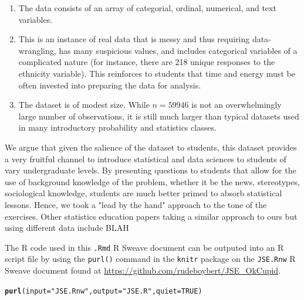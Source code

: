 \documentclass{article}\usepackage[]{graphicx}\usepackage[]{color}
\makeatletter
\newcommand{\hlnum}[1]{\textcolor[rgb]{0.686,0.059,0.569}{#1}}%
\newcommand{\hlstr}[1]{\textcolor[rgb]{0.192,0.494,0.8}{#1}}%
\newcommand{\hlstd}[1]{\textcolor[rgb]{0.345,0.345,0.345}{#1}}%
\newcommand{\hlkwc}[1]{\textcolor[rgb]{0.333,0.667,0.333}{#1}}%
\newcommand{\hlkwd}[1]{\textcolor[rgb]{0.737,0.353,0.396}{\textbf{#1}}}%
\newenvironment{kframe}{%
 \def\at@end@of@kframe{}%
 \ifinner\ifhmode%
  \def\at@end@of@kframe{\end{minipage}}%
  \begin{minipage}{\columnwidth}%
 \fi\fi%
 \def\FrameCommand##1{\hskip\@totalleftmargin \hskip-\fboxsep
 \colorbox{shadecolor}{##1}\hskip-\fboxsep
     \hskip-\linewidth \hskip-\@totalleftmargin \hskip\columnwidth}%
 \MakeFramed {\advance\hsize-\width
   \@totalleftmargin\z@ \linewidth\hsize
   \@setminipage}}%
 {\par\unskip\endMakeFramed%
 \at@end@of@kframe}
\newenvironment{knitrout}{}{} %
\makeatother
\begin{document}
\begin{enumerate}
\item The data consists of an array of categorial, ordinal, numerical, and text variables.
\item This is an instance of real data that is messy and thus requiring data-wrangling, has many suspicious values, and includes categorical variables of a complicated nature (for instance, there are 218 unique responses to the ethnicity variable).  This reinforces to students that time and energy must be often invested into preparing the data for analysis.
\item The dataset is of modest size.  While $n = 59946$ is not an overwhelmingly large number of observations, it is still much larger than typical datasets used in many introductory probability and statistics classes.
\end{enumerate}

We argue that given the salience of the dataset to students, this dataset provides a very fruitful channel to introduce statistical and data sciences to students of vary undergraduate levels.  By presenting questions to students that allow for the use of background knowledge of the problem, whether it be the news, stereotypes, sociological knowledge, students are much better primed to absorb statistical lessons.  Hence, we took a "lead by the hand" approach to the tone of the exercises.  Other statistics education papers taking a similar approach to ours but using different data include BLAH

The R code used in this \verb#.Rmd# R Sweave document can be outputed into an R script file by using the \verb#purl()# command in the \verb#knitr# package on the \verb#JSE.Rnw# R Sweave document found at \url{https://github.com/rudeboybert/JSE_OkCupid}.
\begin{knitrout}
\color{fgcolor}\begin{kframe}
\begin{alltt}
\hlkwd{purl}\hlstd{(}\hlkwc{input}\hlstd{=}\hlstr{"JSE.Rnw"}\hlstd{,} \hlkwc{output}\hlstd{=}\hlstr{"JSE.R"}\hlstd{,} \hlkwc{quiet}\hlstd{=}\hlnum{TRUE}\hlstd{)}
\end{alltt}
\end{kframe}
\end{knitrout}
\end{document}
